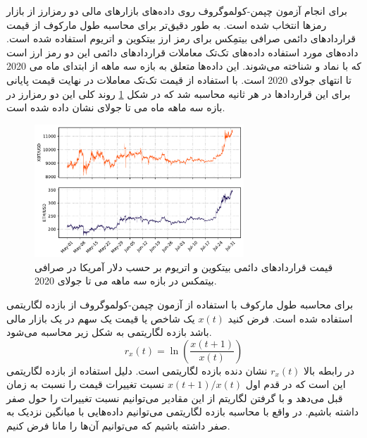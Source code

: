 برای انجام آزمون چپمن-کولموگروف روی داده‌های بازارهای مالی دو رمزارز از بازار رمزها انتخاب شده است. 
به طور دقیق‌تر برای محاسبه طول مارکوف از قیمت 
 قراردادهای دائمی صرافی بیتمِکس 
برای رمز ارز بیتکوین و اتریوم    
 استفاده شده است.\cite{bitmex} داده‌های مورد استفاده داده‌های تک‌تک معاملات 
قراردادهای دائمی این دو رمز ارز است که با نماد  و  شناخته می‌شوند. 
این داده‌ها متعلق به بازه سه ماهه از ابتدای ماه می 2020 تا انتهای جولای 2020 است.
با استفاده از قیمت تک‌تک معاملات در نهایت قیمت پایانی برای این قراردادها در هر ثانیه محاسبه 
شد که در شکل \ref{fig:XBTETH} روند کلی این دو رمزارز در بازه سه ماهه 
ماه می تا جولای نشان داده شده است.
\begin{figure}[H]
    \centering
    \includegraphics[width=0.7\textwidth]{images/xbteth.pdf}
    \caption{قیمت قراردادهای دائمی بیتکوین و اتریوم بر حسب دلار آمریکا در صرافی بیتمکس در بازه سه ماهه می تا جولای 2020.}\label{fig:XBTETH}
\end{figure}
برای محاسبه طول مارکوف با استفاده از آزمون 
چپمن-کولموگروف از بازده لگاریتمی استفاده شده است. فرض کنید $x(t)$ 
یک شاخص یا قیمت یک سهم در یک بازار مالی باشد بازده لگاریتمی به شکل زیر محاسبه می‌شود. 
\begin{equation}
    r_x(t) = \ln \left( \frac{x(t+1)}{x(t)} \right)
\end{equation}
در رابطه بالا $r_x ( t )$ نشان‌ دنده بازده لگاریتمی است. 
دلیل استفاده از بازده لگاریتمی این است که در قدم اول $x(t+1)/x(t)$ نسبت تغییرات 
قیمت را نسبت به زمان قبل می‌دهد و با گرفتن لگاریتم از این مقادیر می‌توانیم نسبت تغییرات را حول 
صفر داشته باشیم. در واقع با محاسبه بازده لگاریتمی می‌توانیم داده‌هایی با میانگین نزدیک به صفر داشته 
باشیم که می‌توانیم آن‌ها را مانا فرض کنیم.
 
